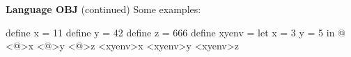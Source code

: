 \begin{minipage}[t]{\sw}
\slidenumber
\LARGE
{\bf Language OBJ} (continued)\exx
Some examples:
\begin{qv}
define x = 11
define y = 42
define z = 666
define xyenv =
  let
    x = 3
    y = 5
  in
    @
<@>x     %
<@>y     %
<@>z     %
<xyenv>x %
<xyenv>y %
<xyenv>z %
\end{qv}
\end{minipage}
